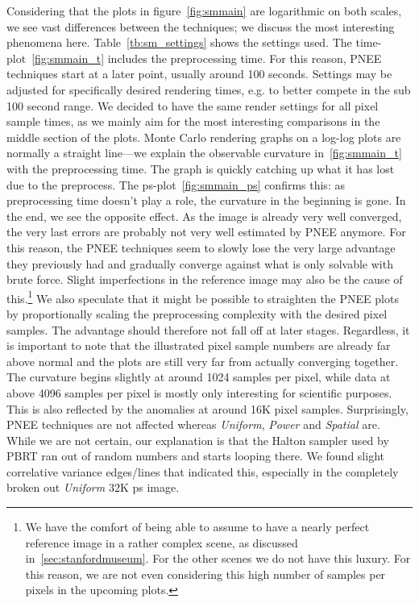 Considering that the plots in figure~\ref{fig:smmain} are logarithmic on both scales, we see vast differences between the techniques; we discuss the most interesting phenomena here. Table~\ref{tb:sm_settings} shows the settings used. The time-plot~\ref{fig:smmain_t} includes the preprocessing time. For this reason, PNEE techniques start at a later point, usually around 100 seconds. Settings may be adjusted for specifically desired rendering times, e.g. to better compete in the sub 100 second range. We decided to have the same render settings for all pixel sample times, as we mainly aim for the most interesting comparisons in the middle section of the plots. Monte Carlo rendering graphs on a log-log plots are normally a straight line---we explain the observable curvature in~\ref{fig:smmain_t} with the preprocessing time. The graph is quickly catching up what it has lost due to the preprocess. The ps-plot~\ref{fig:smmain_ps} confirms this: as preprocessing time doesn't play a role, the curvature in the beginning is gone. In the end, we see the opposite effect. As the image is already very well converged, the very last errors are probably not very well estimated by PNEE anymore. For this reason, the PNEE techniques seem to slowly lose the very large advantage they previously had and gradually converge against what is only solvable with brute force. Slight imperfections in the reference image may also be the cause of this.\footnote{We have the comfort of being able to assume to have a nearly perfect reference image in a rather complex scene, as discussed in~\ref{sec:stanfordmuseum}. For the other scenes we do not have this luxury. For this reason, we are not even considering this high number of samples per pixels in the upcoming plots.} We also speculate that it might be possible to straighten the PNEE plots by proportionally scaling the preprocessing complexity with the desired pixel samples. The advantage should therefore not fall off at later stages. Regardless, it is important to note that the illustrated pixel sample numbers are already far above normal and the plots are still very far from actually converging together. The curvature begins slightly at around 1024 samples per pixel, while data at above 4096 samples per pixel is mostly only interesting for scientific purposes. This is also reflected by the anomalies at around 16K pixel samples. Surprisingly, PNEE techniques are not affected whereas \textit{Uniform}, \textit{Power} and \textit{Spatial} are. While we are not certain, our explanation is that the Halton sampler used by PBRT ran out of random numbers and starts looping there. We found slight correlative variance edges/lines that indicated this, especially in the completely broken out \textit{Uniform} 32K ps image.

